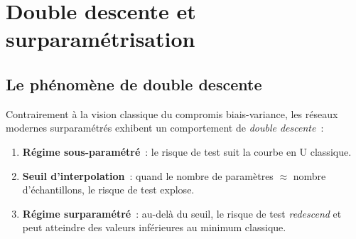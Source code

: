 \section{Double descente et surparam\'etrisation}
\label{sec:double-descent}

\subsection{Le ph\'enom\`ene de double descente}

Contrairement \`a la vision classique du compromis biais-variance, les r\'eseaux
modernes surparam\'etr\'es exhibent un comportement de \emph{double descente}~:

\begin{enumerate}
    \item \textbf{R\'egime sous-param\'etr\'e}~: le risque de test suit la courbe
          en U classique.
    \item \textbf{Seuil d'interpolation}~: quand le nombre de param\`etres
          $\approx$ nombre d'\'echantillons, le risque de test explose.
    \item \textbf{R\'egime surparam\'etr\'e}~: au-del\`a du seuil, le risque
          de test \emph{redescend} et peut atteindre des valeurs inf\'erieures
          au minimum classique.
\end{enumerate}

